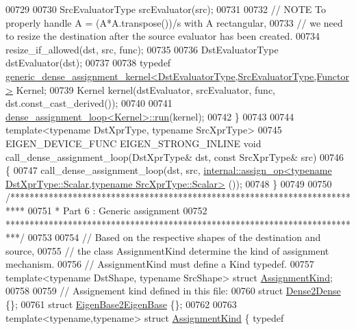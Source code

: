 \begin{DoxyCode}
00729 
00730   SrcEvaluatorType srcEvaluator(src);
00731 
00732   \textcolor{comment}{// NOTE To properly handle A = (A*A.transpose())/s with A rectangular,}
00733   \textcolor{comment}{// we need to resize the destination after the source evaluator has been created.}
00734   resize\_if\_allowed(dst, src, func);
00735 
00736   DstEvaluatorType dstEvaluator(dst);
00737     
00738   \textcolor{keyword}{typedef} 
      \hyperlink{class_eigen_1_1internal_1_1generic__dense__assignment__kernel}{generic\_dense\_assignment\_kernel<DstEvaluatorType,SrcEvaluatorType,Functor>}
       Kernel;
00739   Kernel kernel(dstEvaluator, srcEvaluator, func, dst.const\_cast\_derived());
00740 
00741   \hyperlink{struct_eigen_1_1internal_1_1dense__assignment__loop}{dense\_assignment\_loop<Kernel>::run}(kernel);
00742 \}
00743 
00744 \textcolor{keyword}{template}<\textcolor{keyword}{typename} DstXprType, \textcolor{keyword}{typename} SrcXprType>
00745 EIGEN\_DEVICE\_FUNC EIGEN\_STRONG\_INLINE \textcolor{keywordtype}{void} call\_dense\_assignment\_loop(DstXprType& dst, \textcolor{keyword}{const} SrcXprType& 
      src)
00746 \{
00747   call\_dense\_assignment\_loop(dst, src, 
      \hyperlink{struct_eigen_1_1internal_1_1assign__op}{internal::assign\_op<typename DstXprType::Scalar,typename SrcXprType::Scalar>}
      ());
00748 \}
00749 
00750 \textcolor{comment}{/***************************************************************************}
00751 \textcolor{comment}{* Part 6 : Generic assignment}
00752 \textcolor{comment}{***************************************************************************/}
00753 
00754 \textcolor{comment}{// Based on the respective shapes of the destination and source,}
00755 \textcolor{comment}{// the class AssignmentKind determine the kind of assignment mechanism.}
00756 \textcolor{comment}{// AssignmentKind must define a Kind typedef.}
00757 \textcolor{keyword}{template}<\textcolor{keyword}{typename} DstShape, \textcolor{keyword}{typename} SrcShape> \textcolor{keyword}{struct }\hyperlink{struct_eigen_1_1internal_1_1_assignment_kind}{AssignmentKind};
00758 
00759 \textcolor{comment}{// Assignement kind defined in this file:}
00760 \textcolor{keyword}{struct }\hyperlink{struct_eigen_1_1internal_1_1_dense2_dense}{Dense2Dense} \{\};
00761 \textcolor{keyword}{struct }\hyperlink{struct_eigen_1_1internal_1_1_eigen_base2_eigen_base}{EigenBase2EigenBase} \{\};
00762 
00763 \textcolor{keyword}{template}<\textcolor{keyword}{typename},\textcolor{keyword}{typename}> \textcolor{keyword}{struct }\hyperlink{struct_eigen_1_1internal_1_1_assignment_kind}{AssignmentKind} \{ \textcolor{keyword}{typedef} 

\end{DoxyCode}
